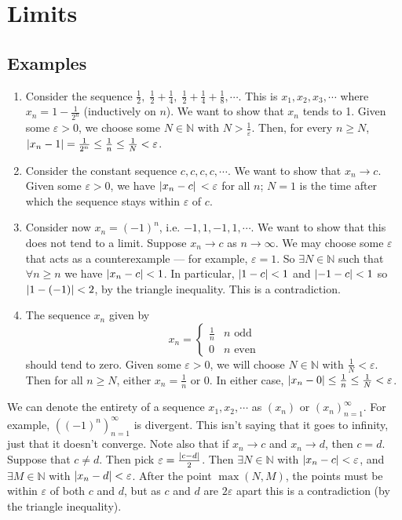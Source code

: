 \documentclass{article}
\begin{document}
	\section{Limits}
	\subsection{Examples}
	\begin{enumerate}
		\item Consider the sequence $\frac{1}{2},\; \frac{1}{2} + \frac{1}{4},\; \frac{1}{2} + \frac{1}{4} + \frac{1}{8}, \cdots$. This is $x_1, x_2, x_3, \cdots$ where $x_n = 1 - \frac{1}{2^n}$ (inductively on $n$). We want to show that $x_n$ tends to 1. Given some $\varepsilon > 0$, we choose some $N \in \mathbb N$ with $N > \frac{1}{\varepsilon}$. Then, for every $n \geq N$, $\abs{x_n - 1} = \frac{1}{2^n} \leq \frac{1}{n} \leq \frac{1}{N} < \varepsilon$.
		\item Consider the constant sequence $c, c, c, c, \cdots$. We want to show that $x_n \to c$. Given some $\varepsilon > 0$, we have $\abs*{x_n - c} < \varepsilon$ for all $n$; $N=1$ is the time after which the sequence stays within $\varepsilon$ of $c$.
		\item Consider now $x_n = (-1)^n$, i.e. $-1, 1, -1, 1, \cdots$. We want to show that this does not tend to a limit. Suppose $x_n \to c$ as $n \to \infty$. We may choose some $\varepsilon$ that acts as a counterexample --- for example, $\varepsilon = 1$. So $\exists N \in \mathbb N$ such that $\forall n \geq n$ we have $\abs{x_n - c} < 1$. In particular, $\abs{1 - c} < 1$ and $\abs{-1 - c} < 1$ so $\abs{1 - (-1)} < 2$, by the triangle inequality. This is a contradiction.
		\item The sequence $x_n$ given by
		\[
			x_n = \begin{cases}
				\frac{1}{n} & n \text{ odd} \\
				0 & n \text{ even}
			\end{cases}
		\]
		should tend to zero. Given some $\varepsilon > 0$, we will choose $N \in \mathbb N$ with $\frac{1}{N} < \varepsilon$. Then for all $n \geq N$, either $x_n = \frac{1}{n}$ or 0. In either case, $\abs{x_n - 0} \leq \frac{1}{n} \leq \frac{1}{N} < \varepsilon$.
	\end{enumerate}
	We can denote the entirety of a sequence $x_1, x_2, \cdots$ as $(x_n)$ or $(x_n)_{n=1}^\infty$. For example, $\left( (-1)^n \right)_{n=1}^{\infty}$ is divergent. This isn't saying that it goes to infinity, just that it doesn't converge. Note also that if $x_n \to c$ and $x_n \to d$, then $c=d$. Suppose that $c \neq d$. Then pick $\varepsilon = \frac{\abs{c-d}}{2}$. Then $\exists N \in \mathbb N$ with $\abs{x_n - c} < \varepsilon$, and $\exists M \in \mathbb N$ with $\abs{x_n - d} < \varepsilon$. After the point $\max(N, M)$, the points must be within $\varepsilon$ of both $c$ and $d$, but as $c$ and $d$ are $2\varepsilon$ apart this is a contradiction (by the triangle inequality).
	
\end{document}
